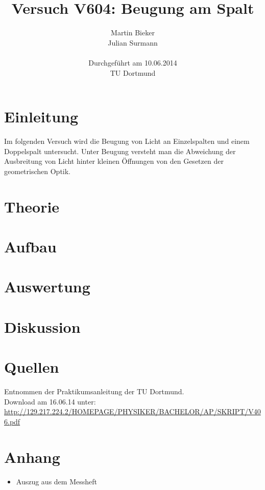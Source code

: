 \documentclass[11pt,ngerman,a4paper]{article}
\title{\textbf{Versuch V604: Beugung am Spalt}}
\author{Martin Bieker\\
		Julian Surmann\\
		\\
		Durchgef\"{u}hrt am 10.06.2014\\
		TU Dortmund}
\date{}
\begin{document}
\renewcommand\tablename{Tabelle}
\renewcommand\figurename{Abbildung}
\maketitle
\thispagestyle{empty}
\newpage
\clearpage
\setcounter{page}{1}


\section{Einleitung}
Im folgenden Versuch wird die Beugung von Licht an Einzelspalten und einem Doppelspalt untersucht. Unter Beugung versteht man die Abweichung der Ausbreitung von Licht hinter kleinen Öffnungen von den Gesetzen der geometrischen Optik.
\section{Theorie}

\section{Aufbau}

\section{Auswertung}

\section{Diskussion}

\section{Quellen}
\begin{enumerate}[{[}1{]}]
\item Entnommen der Praktikumsanleitung \textit{} der TU Dortmund. \\
Download am 16.06.14 unter:\\
 \url{http://129.217.224.2/HOMEPAGE/PHYSIKER/BACHELOR/AP/SKRIPT/V406.pdf}
\end{enumerate}
\section{Anhang}
\begin{itemize}
\item Auszug aus dem Messheft
\end{itemize}
\end{document}
